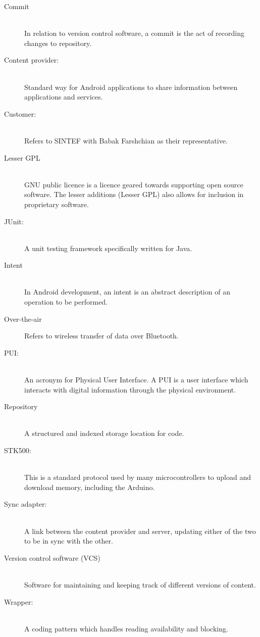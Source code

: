\begin{description}
	\item[Commit]\hfill \\
		In relation to version control software, a commit is the act of recording changes to repository.
	\item[Content provider:]\hfill \\
		Standard way for Android applications to share information between applications and services.
	\item[Customer:]\hfill \\
		Refers to SINTEF with Babak Farshchian as their representative.
	\item[Lesser GPL] \hfill \\
		GNU public licence is a licence geared towards supporting open source software. The lesser additions (Lesser GPL) also allows for inclusion in proprietary software.
	\item[JUnit:]\hfill \\
		A unit testing framework specifically written for Java.
	\item[Intent] \hfill \\
		In Android development, an intent is an abstract description of an operation to be performed.
	\item[Over-the-air]
		Refers to wireless transfer of data over Bluetooth.
	\item[PUI:]\hfill \\
		An acronym for Physical User Interface. A PUI is a user interface which interacts with digital information through the physical environment.
	\item[Repository]\hfill \\
		A structured and indexed storage location for code.
	\item[STK500:]\hfill \\
		This is a standard protocol used by many microcontrollers to upload and download memory, including the Arduino.
	\item[Sync adapter:]\hfill \\
		A link between the content provider and server, updating either of the two to be in sync with the other.
	\item[Version control software (VCS)]\hfill \\
		Software for maintaining and keeping track of different versions of content.
	\item[Wrapper:]\hfill \\
		A coding pattern which handles reading availability and blocking.
\end{description}


